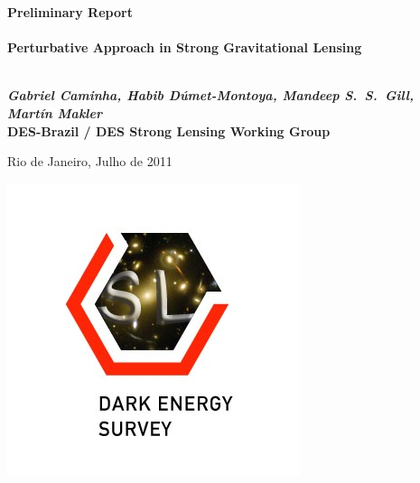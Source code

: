 \begin{titlepage}

\begin{center}



\textbf{\Large Preliminary Report  }\\[3.5cm]

\HRule \\[0.6cm]
{ \large \bfseries Perturbative Approach in Strong Gravitational Lensing}\\[0.4cm]

\HRule \\[1.0cm]

\vspace{2.0cm}

{\Large \textbf{\textit{ Gabriel Caminha, Habib D\'umet-Montoya, Mandeep S.~S.~Gill, Mart\'in Makler}}}\\
{\large \textbf{DES-Brazil / DES Strong Lensing Working Group}}\\[1.5cm]

\vfill

{\large Rio de Janeiro, Julho de 2011}

\end{center}

\begin{flushright}
    \includegraphics[scale=0.5]{graphics/SLSG-Logo.jpg}
\end{flushright}

\end{titlepage} 
